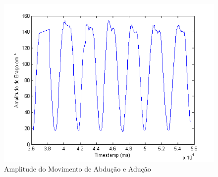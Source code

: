 
\begin{figure}[!htb]
     \centering
     \includegraphics[width=1\textwidth]{./img/amplitude-braco.png}
     \caption{Amplitude do Movimento de Abdução e Adução}
     \label{img:amplitude_braco}
\end{figure}


% 
% 

